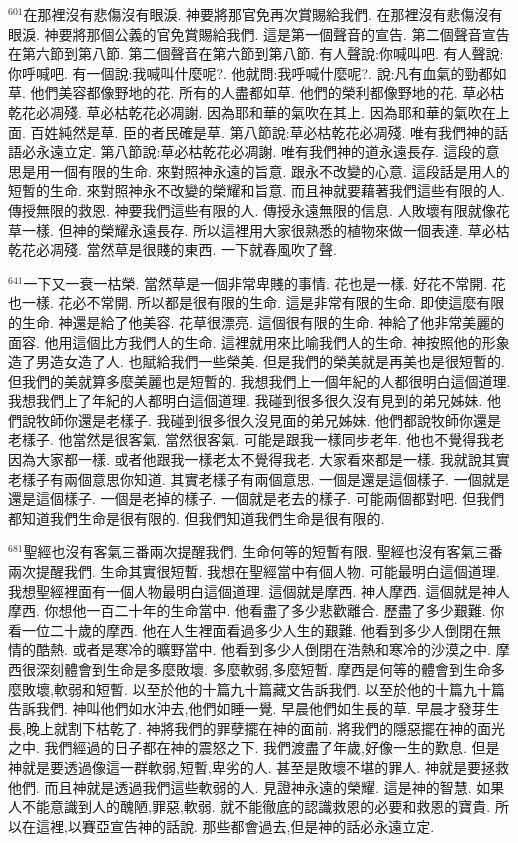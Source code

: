 \documentclass{book}
\begin{document}
$^{601}$在那裡沒有悲傷沒有眼淚.
神要將那官免再次賞賜給我們.
在那裡沒有悲傷沒有眼淚.
神要將那個公義的官免賞賜給我們.
這是第一個聲音的宣告.
第二個聲音宣告在第六節到第八節.
第二個聲音在第六節到第八節.
有人聲說:你喊叫吧.
有人聲說:你呼喊吧.
有一個說:我喊叫什麼呢?.
他就問:我呼喊什麼呢?.
說:凡有血氣的勁都如草.
他們美容都像野地的花.
所有的人盡都如草.
他們的榮利都像野地的花.
草必枯乾花必凋殘.
草必枯乾花必凋謝.
因為耶和華的氣吹在其上.
因為耶和華的氣吹在上面.
百姓純然是草.
臣的者民確是草.
第八節說:草必枯乾花必凋殘.
唯有我們神的話語必永遠立定.
第八節說:草必枯乾花必凋謝.
唯有我們神的道永遠長存.
這段的意思是用一個有限的生命.
來對照神永遠的旨意.
跟永不改變的心意.
這段話是用人的短暫的生命.
來對照神永不改變的榮耀和旨意.
而且神就要藉著我們這些有限的人.
傳授無限的救恩.
神要我們這些有限的人.
傳授永遠無限的信息.
人敗壞有限就像花草一樣.
但神的榮耀永遠長存.
所以這裡用大家很熟悉的植物來做一個表達.
草必枯乾花必凋殘.
當然草是很賤的東西.
一下就春風吹了聲.

$^{641}$一下又一衰一枯榮.
當然草是一個非常卑賤的事情.
花也是一樣.
好花不常開.
花也一樣.
花必不常開.
所以都是很有限的生命.
這是非常有限的生命.
即使這麼有限的生命.
神還是給了他美容.
花草很漂亮.
這個很有限的生命.
神給了他非常美麗的面容.
他用這個比方我們人的生命.
這裡就用來比喻我們人的生命.
神按照他的形象造了男造女造了人.
也賦給我們一些榮美.
但是我們的榮美就是再美也是很短暫的.
但我們的美就算多麼美麗也是短暫的.
我想我們上一個年紀的人都很明白這個道理.
我想我們上了年紀的人都明白這個道理.
我碰到很多很久沒有見到的弟兄姊妹.
他們說牧師你還是老樣子.
我碰到很多很久沒見面的弟兄姊妹.
他們都說牧師你還是老樣子.
他當然是很客氣.
當然很客氣.
可能是跟我一樣同步老年.
他也不覺得我老因為大家都一樣.
或者他跟我一樣老太不覺得我老.
大家看來都是一樣.
我就說其實老樣子有兩個意思你知道.
其實老樣子有兩個意思.
一個是還是這個樣子.
一個就是還是這個樣子.
一個是老掉的樣子.
一個就是老去的樣子.
可能兩個都對吧.
但我們都知道我們生命是很有限的.
但我們知道我們生命是很有限的.

$^{681}$聖經也沒有客氣三番兩次提醒我們.
生命何等的短暫有限.
聖經也沒有客氣三番兩次提醒我們.
生命其實很短暫.
我想在聖經當中有個人物.
可能最明白這個道理.
我想聖經裡面有一個人物最明白這個道理.
這個就是摩西.
神人摩西.
這個就是神人摩西.
你想他一百二十年的生命當中.
他看盡了多少悲歡離合.
歷盡了多少艱難.
你看一位二十歲的摩西.
他在人生裡面看過多少人生的艱難.
他看到多少人倒閉在無情的酷熱.
或者是寒冷的曠野當中.
他看到多少人倒閉在浩熱和寒冷的沙漠之中.
摩西很深刻體會到生命是多麼敗壞.
多麼軟弱,多麼短暫.
摩西是何等的體會到生命多麼敗壞,軟弱和短暫.
以至於他的十篇九十篇藏文告訴我們.
以至於他的十篇九十篇告訴我們.
神叫他們如水沖去,他們如睡一覺.
早晨他們如生長的草.
早晨才發芽生長,晚上就割下枯乾了.
神將我們的罪孽擺在神的面前.
將我們的隱惡擺在神的面光之中.
我們經過的日子都在神的震怒之下.
我們渡盡了年歲,好像一生的歎息.
但是神就是要透過像這一群軟弱,短暫,卑劣的人.
甚至是敗壞不堪的罪人.
神就是要拯救他們.
而且神就是透過我們這些軟弱的人.
見證神永遠的榮耀.
這是神的智慧.
如果人不能意識到人的醜陋,罪惡,軟弱.
就不能徹底的認識救恩的必要和救恩的寶貴.
所以在這裡,以賽亞宣告神的話說.
那些都會過去,但是神的話必永遠立定.
\end{document}
